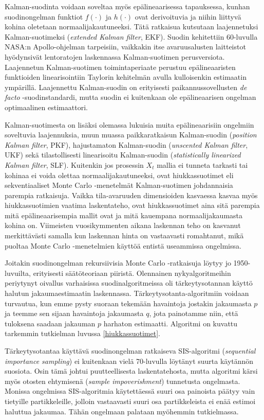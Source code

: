 \documentclass[
  12pt,
  a4paper, twoside]{book}
\begin{document}
Kalman-suodinta voidaan soveltaa myös epälineaarisessa tapauksessa, kunhan suodinongelman funktiot \(f(\cdot)\) ja \(h(\cdot)\) ovat derivoituvia ja niihin liittyvä kohina oletetaan normaalijakautuneeksi. Tätä ratkaisua kutsutaan laajennetuksi Kalman-suotimeksi (\emph{extended Kalman filter}, EKF). Suodin kehitettiin 60-luvulla NASA:n Apollo-ohjelman tarpeisiin, vaikkakin itse avaruusalusten laitteistot hyödynsivät lentoratojen laskennassa Kalman-suotimen perusversiota. Laajennetun Kalman-suotimen toimintaperiaate perustuu epälineaaristen funktioiden linearisointiin Taylorin kehitelmän avulla kulloisenkin estimaatin ympärillä. Laajennettu Kalman-suodin on erityisesti paikannussovellusten \textit{de facto} -suodinstandardi, mutta suodin ei kuitenkaan ole epälineaarisen ongelman optimaalinen estimaattori.

Kalman-suotimesta on lisäksi olemassa lukuisia muita epälineaarisiin ongelmiin soveltuvia laajennuksia, muun muassa paikkaratkaisun Kalman-suodin (\emph{position Kalman filter}, PKF), hajustamaton Kalman-suodin (\emph{unscented Kalman filter}, UKF) sekä tilastollisesti linearisoitu Kalman-suodin (\emph{statistically linearized Kalman filter}, SLF). Kuitenkin jos prosessin \(X_t\) mallia ei tunneta tarkasti tai kohinaa ei voida olettaa normaalijakautuneeksi, ovat hiukkassuotimet eli sekventiaaliset Monte Carlo -menetelmät Kalman-suotimen johdannaisia parempia ratkaisuja. Vaikka tila-avaruuden dimensioiden kasvaessa kasvaa myös hiukkassuotimien vaatima laskentateho, ovat hiukkassuotimet aina sitä parempia mitä epälineaarisempia mallit ovat ja mitä kauempana normaalijakaumasta kohina on. Viimeisten vuosikymmenten aikana laskennan teho on kasvanut merkittävästi samalla kun laskennan hinta on vastaavasti romahtanut, mikä puoltaa Monte Carlo -menetelmien käyttöä entistä useammissa ongelmissa.

Joitakin suodinongelman rekursiivisia Monte Carlo -ratkaisuja löytyy jo 1950-luvuilta, erityisesti säätöteoriaan piiristä. Olennainen nykyalgoritmeihin periytynyt oivallus varhaisissa suodinalgoritmeissa oli tärkeytysotannan käyttö halutun jakaumaestimaatin laskennassa. Tärkeytysotanta-algoritmiin voidaan turvautua, kun emme pysty suoraan tekemään havaintoja jostakin jakaumasta \(p\) ja teemme sen sijaan havaintoja jakaumasta \(q\), jota painotamme niin, että tuloksena saadaan jakauman \(p\) harhaton estimaatti. Algoritmi on kuvattu tarkemmin tutkielman luvussa \ref{hiukkassuotimet}.

Tärkeytysotantaa käyttävä suodinongelman ratkaiseva SIS-algoritmi (\emph{sequential importance sampling}) ei kuitenkaan vielä 70-luvulla löytänyt suurta käytännön suosiota. Osin tämä johtui puutteellisesta laskentatehosta, mutta algoritmi kärsi myös otosten ehtymisenä (\emph{sample impoverishment}) tunnetusta ongelmasta. Monissa ongelmissa SIS-algoritmia käytettäessä suuri osa painoista päätyy vain tietyille partikkeleille, jolloin vastaavasti suuri osa partikkeleista ei enää estimoi haluttua jakaumaa. Tähän ongelmaan palataan myöhemmin tutkielmassa.
\end{document}
